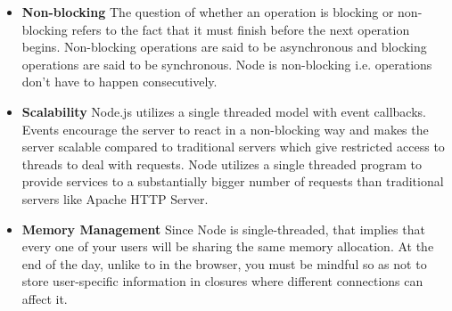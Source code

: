 \documentclass[../thesis.tex]{subfiles}
\begin{document}
\begin{itemize}
    \vspace{5mm}
    \item \textbf{Non-blocking}
    \vspace{5mm}
    The question of whether an operation is blocking or non-blocking refers to the fact that it must finish before the next operation begins. Non-blocking operations are said to be asynchronous and blocking operations are said to be synchronous. Node is non-blocking i.e. operations don't have to happen consecutively.
    \vspace{5mm}
    \item \textbf{Scalability}
    \vspace{5mm}
    Node.js utilizes a single threaded model with event callbacks. Events encourage the server to react in a non-blocking way and makes the server scalable compared to traditional servers which give restricted access to threads to deal with requests. Node utilizes a single threaded program to provide services to a substantially bigger number of requests than traditional servers like Apache HTTP Server.
    \vspace{5mm}
    \item \textbf{Memory Management}
    \vspace{5mm}
    Since Node is single-threaded, that implies that every one of your users will be sharing the same memory allocation. At the end of the day, unlike to in the browser, you must be mindful so as not to store user-specific information in closures where different connections can affect it.
\end{itemize}
\end{document}
